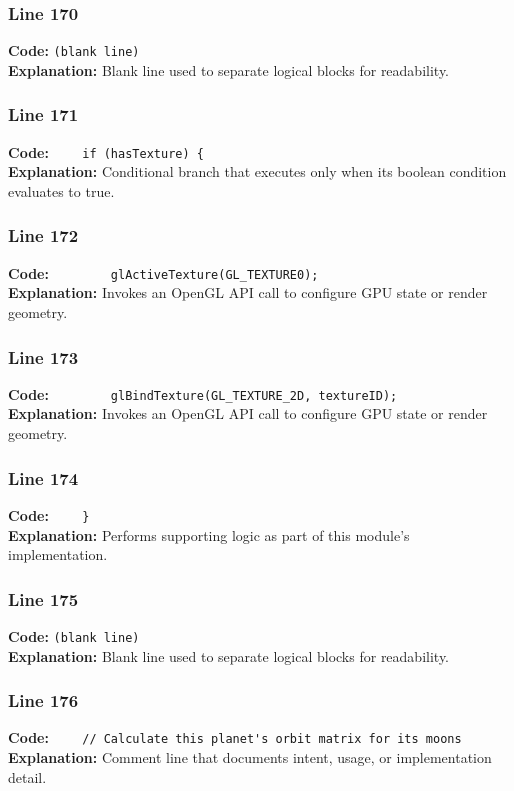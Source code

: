 \documentclass[11pt,a4paper]{article}
\begin{document}
\subsubsection*{Line 170}
\textbf{Code:} \texttt{(blank line)}\\
\textbf{Explanation:} Blank line used to separate logical blocks for readability.

\subsubsection*{Line 171}
\textbf{Code:} \verb|    if (hasTexture) {|\\
\textbf{Explanation:} Conditional branch that executes only when its boolean condition evaluates to true.

\subsubsection*{Line 172}
\textbf{Code:} \verb|        glActiveTexture(GL_TEXTURE0);|\\
\textbf{Explanation:} Invokes an OpenGL API call to configure GPU state or render geometry.

\subsubsection*{Line 173}
\textbf{Code:} \verb|        glBindTexture(GL_TEXTURE_2D, textureID);|\\
\textbf{Explanation:} Invokes an OpenGL API call to configure GPU state or render geometry.

\subsubsection*{Line 174}
\textbf{Code:} \verb|    }|\\
\textbf{Explanation:} Performs supporting logic as part of this module's implementation.

\subsubsection*{Line 175}
\textbf{Code:} \texttt{(blank line)}\\
\textbf{Explanation:} Blank line used to separate logical blocks for readability.

\subsubsection*{Line 176}
\textbf{Code:} \verb|    // Calculate this planet's orbit matrix for its moons|\\
\textbf{Explanation:} Comment line that documents intent, usage, or implementation detail.
\end{document}
